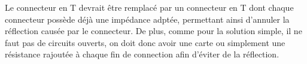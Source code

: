  Le connecteur en T devrait être remplacé par un connecteur en T dont chaque connecteur possède déjà une impédance adptée, permettant ainsi 
 d'annuler la réflection causée par le connecteur. De plus, comme pour la solution simple, il ne faut pas de circuits ouverts, on doit donc avoir
 une carte ou simplement une résistance rajoutée à chaque fin de connection afin d'éviter de la réflection.